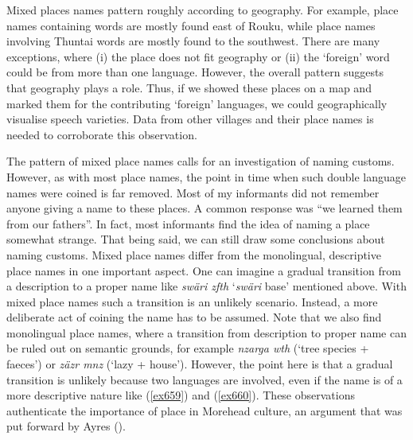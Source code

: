 Mixed places names pattern roughly according to geography. For example, place names containing  words are mostly found east of Rouku, while place names involving  Thuntai words are mostly found to the southwest. There are many exceptions, where (i) the place does not fit geography or (ii) the `foreign' word could be from more than one language. However, the overall pattern suggests that geography plays a role. Thus, if we showed these places on a map and marked them for the contributing `foreign' languages, we could geographically visualise speech varieties. Data from other villages and their place names is needed to corroborate this observation.

The pattern of mixed place names calls for an investigation of naming customs. However, as with most place names, the point in time when such double language names were coined is far removed. Most of my informants did not remember anyone giving a name to these places. A common response was ``we learned them from our fathers''. In fact, most informants find the idea of naming a place somewhat strange. That being said, we can still draw some conclusions about naming customs. Mixed place names differ from the monolingual, descriptive place names in one important aspect. One can imagine a gradual transition from a description to a proper name like \emph{swäri zfth} `\emph{swäri} base' mentioned above. With mixed place names such a transition is an unlikely scenario. Instead, a more deliberate act of coining the name has to be assumed. Note that we also find monolingual place names, where a transition from description to proper name can be ruled out on semantic grounds, for example \emph{nzarga wth} (`tree species + faeces') or \emph{zäzr mnz} (`lazy + house'). However, the point here is that a gradual transition is unlikely because two languages are involved, even if the name is of a more descriptive nature like (\ref{ex659}) and (\ref{ex660}). These observations authenticate the importance of place in Morehead culture, an argument that was put forward by Ayres (\citeyear{Ayres:ws}).

